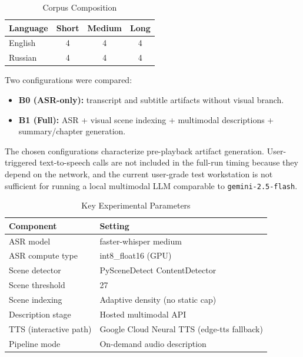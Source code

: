 ﻿\documentclass[conference]{IEEEtran}
\begin{document}
\begin{table}[t]
\caption{Corpus Composition}
\label{tab:corpus_comp}
\centering
\footnotesize
\setlength{\tabcolsep}{5pt}
\begin{tabular}{lccc}
\toprule
\textbf{Language} & \textbf{Short} & \textbf{Medium} & \textbf{Long} \\
\midrule
English & 4 & 4 & 4 \\
Russian & 4 & 4 & 4 \\
\bottomrule
\end{tabular}
\end{table}

Two configurations were compared:
\begin{itemize}
\item \textbf{B0 (ASR-only):} transcript and subtitle artifacts without visual branch.
\item \textbf{B1 (Full):} ASR + visual scene indexing + multimodal descriptions + summary/chapter generation.
\end{itemize}
The chosen configurations characterize pre-playback artifact generation. User-triggered text-to-speech calls are not included in the full-run timing because they depend on the network, and the current user-grade test workstation is not sufficient for running a local multimodal LLM comparable to \texttt{gemini-2.5-flash}.

\begin{table}[t]
\caption{Key Experimental Parameters}
\label{tab:exp_params}
\centering
\footnotesize
\setlength{\tabcolsep}{4.5pt}
\begin{tabular}{ll}
\toprule
\textbf{Component} & \textbf{Setting} \\
\midrule
ASR model & faster-whisper medium \\
ASR compute type & int8\_float16 (GPU) \\
Scene detector & PySceneDetect ContentDetector \\
Scene threshold & 27 \\
Scene indexing & Adaptive density (no static cap) \\
Description stage & Hosted multimodal API \\
TTS (interactive path) & Google Cloud Neural TTS (edge-tts fallback) \\
Pipeline mode & On-demand audio description \\
\bottomrule
\end{tabular}
\end{table}
\end{document}
